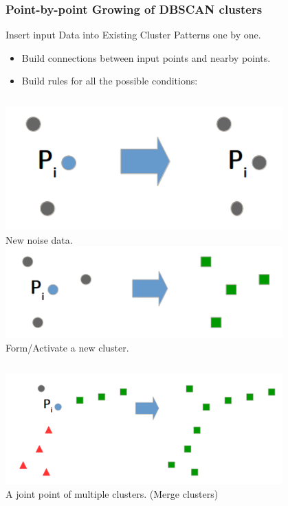 \begin{frame}
    \frametitle{Point-by-point Growing of DBSCAN clusters}
    Insert input Data into Existing Cluster Patterns one by one.
    \begin{itemize}
	    \item Build connections between input points and nearby points.
	    \item Build rules for all the possible conditions:
    \end{itemize}
    \begin{columns}
            \centering
            \includegraphics[width=0.8\textwidth]{resource/figures/condition1.png}
            \\ \tiny New noise data.
            \centering
            \includegraphics[width=0.8\textwidth]{resource/figures/condition2.png}
            \\ \tiny Form/Activate a new cluster.
    \end{columns}
        \begin{columns}
            \centering
            \includegraphics[width=0.8\textwidth]{resource/figures/condition3.png}
            \\ \tiny A joint point of multiple clusters. (Merge clusters)

\end{columns}
\end{frame}
